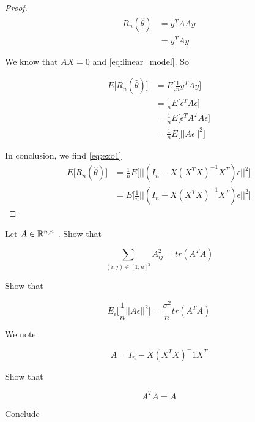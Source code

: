\begin{proof}
    \begin{align*}
        R_n (\hat{\theta}) &= y ^T A A y \\
            &= y^T A y
    \end{align*}

    We know that $AX = 0$ and \eqref{eq:linear_model}. So

    \begin{align*}
         E \Big[ R_n (\hat{\theta}) \Big] &= E \Big [ \frac{1}{n} y^T A y \Big ] \\
            &= \frac{1}{n}  E \Big [  \epsilon^T A \epsilon \Big ] \\
            &= \frac{1}{n}  E \Big [  \epsilon^T A^T A \epsilon \Big ] \\
            &= \frac{1}{n}  E \Big [  || A \epsilon  ||^2 \Big ]
    \end{align*}

    In conclusion, we find \eqref{eq:exo1}
    \begin{align*}
        E \Big[ R_n (\hat{\theta}) \Big] &= \frac{1}{n}  E \Big [  || (I_n - X (X^T X)^{-1} X^T) \epsilon  ||^2 \Big ] \\
            &= E \Big [ \frac{1}{n}    || (I_n - X (X^T X)^{-1} X^T) \epsilon  ||^2 \Big ]
    \end{align*}
    
\end{proof}


Let $A \in \mathbb{R} ^{n, n}$ . Show that

\begin{equation}
    		\sum_{(i, j)  \in [1, n]^2} A^2_{ij} =  tr(A^T A)
\end{equation}


Show that 

\begin{equation}
    E_\epsilon \Big[ \frac{1}{n} ||A\epsilon ||^2 \Big] = \frac{\sigma^2}{n} tr(A^T A)
\end{equation}


We note

\begin{equation}
    A = I_n - X (X^T X)^-1 X^T
\end{equation}

Show that

\begin{equation}
    A^T A = A
\end{equation}


Conclude
